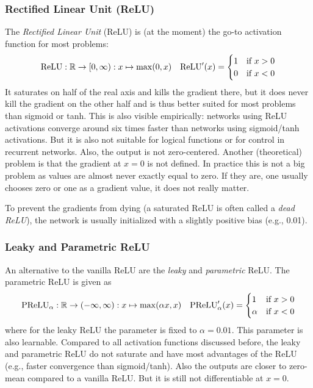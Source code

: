 		\subsubsection{Rectified Linear Unit (ReLU)}
			The \emph{Rectified Linear Unit} (ReLU) is (at the moment) the go-to activation function for most problems:
			\begin{align}
				\mathrm{ReLU} : \mathbb{R} \to [0, \infty) : x \mapsto \max(0, x) &&
				\mathrm{ReLU}'(x) =
					\begin{cases}
						1 & \text{if } x > 0 \\
						0 & \text{if } x < 0
					\end{cases}
			\end{align}
			It saturates on half of the real axis and kills the gradient there, but it does never kill the gradient on the other half and is thus better suited for most problems than sigmoid or tanh. This is also visible empirically: networks using ReLU activations converge around six times faster than networks using sigmoid/tanh activations. But it is also not suitable for logical functions or for control in recurrent networks. Also, the output is not zero-centered. Another (theoretical) problem is that the gradient at \(x = 0\) is not defined. In practice this is not a big problem as values are almost never exactly equal to zero. If they are, one usually chooses zero or one as a gradient value, it does not really matter.

			To prevent the gradients from dying (a saturated ReLU is often called a \emph{dead ReLU}), the network is usually initialized with a slightly positive bias (e.g., \num{0.01}).

		\subsubsection{Leaky and Parametric ReLU}
			An alternative to the vanilla ReLU are the \emph{leaky} and \emph{parametric} ReLU. The parametric ReLU is given as
			\begin{align}
				\mathrm{PReLU}_\alpha : \mathbb{R} \to (-\infty, \infty) : x \mapsto \max(\alpha x, x) &&
				\mathrm{PReLU}_\alpha'(x) =
					\begin{cases}
						1      & \text{if } x > 0 \\
						\alpha & \text{if } x < 0
					\end{cases}
			\end{align}
			where for the leaky ReLU the parameter is fixed to \( \alpha = 0.01 \). This parameter is also learnable. Compared to all activation functions discussed before, the leaky and parametric ReLU do not saturate and have most advantages of the ReLU (e.g., faster convergence than sigmoid/tanh). Also the outputs are closer to zero-mean compared to a vanilla ReLU. But it is still not differentiable at \( x = 0 \).


